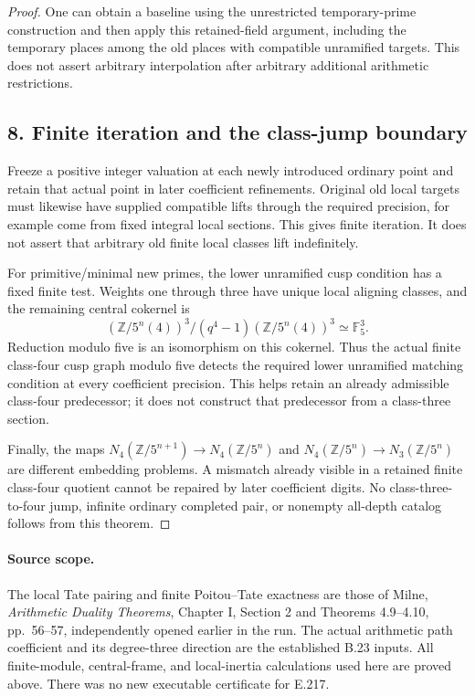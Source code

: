 \documentclass[11pt]{article}
\newcommand{\Z}{\mathbb Z}\newcommand{\F}{\mathbb F}\newcommand{\Q}{\mathbb Q}
\begin{document}
\begin{proof}
One can obtain a baseline using the unrestricted temporary-prime construction and then apply this retained-field argument, including the temporary places among the old places with compatible unramified targets. This does not assert arbitrary interpolation after arbitrary additional arithmetic restrictions.

\subsection*{8. Finite iteration and the class-jump boundary}
Freeze a positive integer valuation at each newly introduced ordinary point and retain that actual point in later coefficient refinements. Original old local targets must likewise have supplied compatible lifts through the required precision, for example come from fixed integral local sections. This gives finite iteration. It does not assert that arbitrary old finite local classes lift indefinitely.

For primitive/minimal new primes, the lower unramified cusp condition has a fixed finite test. Weights one through three have unique local aligning classes, and the remaining central cokernel is
\[
 (\Z/5^n(4))^3/(q^4-1)(\Z/5^n(4))^3\simeq\F_5^3.
\]
Reduction modulo five is an isomorphism on this cokernel. Thus the actual finite class-four cusp graph modulo five detects the required lower unramified matching condition at every coefficient precision. This helps retain an already admissible class-four predecessor; it does not construct that predecessor from a class-three section.

Finally, the maps $N_4(\Z/5^{n+1})\to N_4(\Z/5^n)$ and $N_4(\Z/5^n)\to N_3(\Z/5^n)$ are different embedding problems. A mismatch already visible in a retained finite class-four quotient cannot be repaired by later coefficient digits. No class-three-to-four jump, infinite ordinary completed pair, or nonempty all-depth catalog follows from this theorem.
\end{proof}

\paragraph{Source scope.}
The local Tate pairing and finite Poitou--Tate exactness are those of Milne, \emph{Arithmetic Duality Theorems}, Chapter I, Section 2 and Theorems 4.9--4.10, pp.~56--57, independently opened earlier in the run. The actual arithmetic path coefficient and its degree-three direction are the established B.23 inputs. All finite-module, central-frame, and local-inertia calculations used here are proved above. There was no new executable certificate for E.217.
\end{document}
